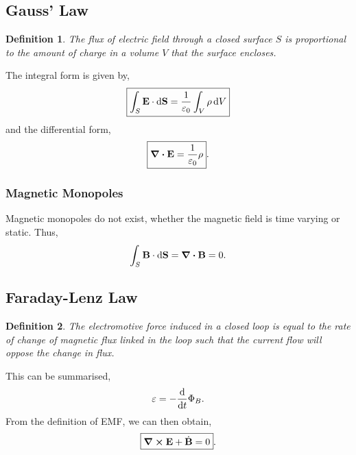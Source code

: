 \documentclass{book}
\newtheorem*{definition}{Definition}
\begin{document}
\subsection{Gauss' Law}
\begin{definition}
	The flux of electric field through a closed surface $S$ is proportional to the amount of charge in a volume $V$ that the surface encloses.
\end{definition}
The integral form is given by,
\begin{equation}
	\boxed{\int_S \vb{E}\cdot\dd{\vb{S}} = \frac{1}{\varepsilon_0}\int_V\rho\dd{V}}
\end{equation}
and the differential form,
\begin{equation}
	\boxed{\div{\vb{E}} = \frac{1}{\varepsilon_0}\rho}.
\end{equation}
\subsubsection{Magnetic Monopoles}
Magnetic monopoles do not exist, whether the magnetic field is time varying or static. Thus,
\begin{equation}
	\int_S\vb{B}\cdot\dd{\vb{S}} = \div{\vb{B}} = 0.
\end{equation}
\subsection{Faraday-Lenz Law}
\begin{definition}
	The electromotive force induced in a closed loop is equal to the rate of change of magnetic flux linked in the loop such that the current flow will oppose the change in flux.
\end{definition}
This can be summarised,
\begin{equation}
	\varepsilon = -\dv{t}\Phi_B.
\end{equation}
From the definition of EMF, we can then obtain,
\begin{equation}
	\boxed{\curl{\vb{E}} + \Dot{\vb{B}} = 0}.
\end{equation}
\end{document}
